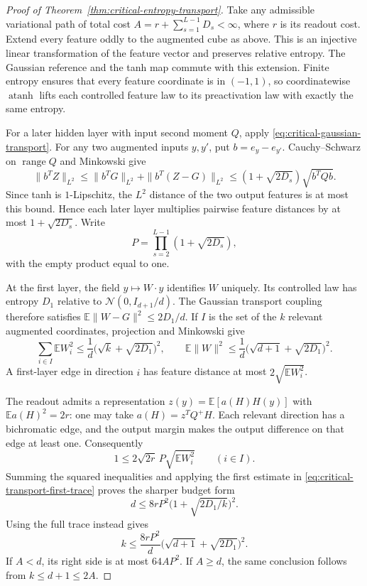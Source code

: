 \begin{proof}[Proof of Theorem~\ref{thm:critical-entropy-transport}]
Take any admissible variational path of total cost
$A=r+\sum_{s=1}^{L-1}D_s<\infty$, where $r$ is its readout cost.
Extend every feature oddly to the augmented cube as above. This is an
injective linear transformation of the feature vector and preserves
relative entropy. The Gaussian reference and the tanh map commute with
this extension. Finite entropy ensures that every feature coordinate is
in $(-1,1)$, so coordinatewise $\operatorname{atanh}$ lifts each controlled
feature law to its preactivation law with exactly the same entropy.

For a later hidden layer with input second moment $Q$, apply
\eqref{eq:critical-gaussian-transport}. For any two augmented inputs
$y,y'$, put $b=e_y-e_{y'}$. Cauchy--Schwarz on
$\operatorname{range}Q$ and Minkowski give
\[
 \|b^TZ\|_{L^2}
 \le\|b^TG\|_{L^2}+\|b^T(Z-G)\|_{L^2}
 \le(1+\sqrt{2D_s})\sqrt{b^TQb}.
\]
Since tanh is $1$-Lipschitz, the $L^2$ distance of the two output
features is at most this bound. Hence each later layer multiplies
pairwise feature distances by at most $1+\sqrt{2D_s}$. Write
\[
 P=\prod_{s=2}^{L-1}(1+\sqrt{2D_s}),
\]
with the empty product equal to one.

At the first layer, the field $y\mapsto W\cdot y$ identifies $W$
uniquely. Its controlled law has entropy $D_1$ relative to
$\mathcal N(0,I_{d+1}/d)$. The Gaussian transport coupling therefore
satisfies $\mathbb E\|W-G\|^2\le2D_1/d$. If $I$ is the set of the
$k$ relevant augmented coordinates, projection and Minkowski give
\begin{equation}
 \sum_{i\in I}\mathbb EW_i^2
 \le\frac1d\bigl(\sqrt k+\sqrt{2D_1}\bigr)^2,
 \qquad
 \mathbb E\|W\|^2
 \le\frac1d\bigl(\sqrt{d+1}+\sqrt{2D_1}\bigr)^2.
 \label{eq:critical-transport-first-trace}
\end{equation}
A first-layer edge in direction $i$ has feature distance at most
$2\sqrt{\mathbb EW_i^2}$.

The readout admits a representation $z(y)=\mathbb E[a(H)H(y)]$
with $\mathbb Ea(H)^2=2r$: one may take
$a(H)=z^TQ^+H$. Each relevant direction has a bichromatic edge, and
the output margin makes the output difference on that edge at least
one. Consequently
\[
 1\le2\sqrt{2r}\,P\sqrt{\mathbb EW_i^2}\qquad(i\in I).
\]
Summing the squared inequalities and applying the first estimate in
\eqref{eq:critical-transport-first-trace} proves the sharper budget form
\begin{equation}
 d\le8rP^2\bigl(1+\sqrt{2D_1/k}\bigr)^2.
 \label{eq:critical-transport-exact-budget}
\end{equation}
Using the full trace instead gives
\[
 k\le\frac{8rP^2}{d}
       \bigl(\sqrt{d+1}+\sqrt{2D_1}\bigr)^2.
\]
If $A<d$, its right side is at most $64AP^2$. If $A\ge d$,
the same conclusion follows from $k\le d+1\le2A$.


\end{proof}
